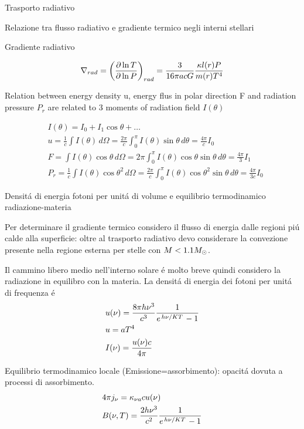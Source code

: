 \documentclass[10pt,xcolor={usenames},fleqn,mathserif,serif]{beamer}
\begin{document}
\begin{frame}{Trasporto radiativo}
\begin{block}{Relazione tra flusso radiativo e gradiente termico negli interni stellari}
\end{block}

\begin{block}{Gradiente radiativo}

\begin{equation*}
\nrad{}=\Dcvar{\PDly{P}{T}}{rad}=\frac{3}{16\pi acG}\frac{\kappa l(r)P}{m(r)T^4}%
\end{equation*}

\end{block}

\end{frame}

\begin{wordonframe}{Relation between energy density u, energy flus in polar direction F and radiation pressure $P_r$ are related to 3 moments of radiation field $I(\theta)$}

\begin{align*}
&I(\theta)=I_0+I_1\cos{\theta}+\ldots\\
&u=\frac{1}{c}\int I(\theta)\,d\Omega=\frac{2\pi}{c}\int_0^{\pi} I(\theta)\sin{\theta}\,d\theta=\frac{4\pi}{c}I_0\\
&F=\int I(\theta)\cos{\theta}\,d\Omega=2\pi\int_0^{\pi} I(\theta)\cos{\theta}\sin{\theta}\,d\theta=\frac{4\pi}{3}I_1\\
&P_r=\frac{1}{c}\int I(\theta)\cos{\theta}^2\,d\Omega=\frac{2\pi}{c}\int_0^{\pi} I(\theta)\cos{\theta}^2\sin{\theta}\,d\theta=\frac{4\pi}{3c}I_0
\end{align*}

\end{wordonframe}

\begin{wordonframe}{Densit\'a di energia fotoni per unit\'a di volume e equilibrio termodinamico radiazione-materia}

Per determinare il gradiente termico considero il flusso di energia dalle regioni pi\'u calde alla superficie: oltre al trasporto radiativo devo considerare la convezione presente nella regione esterna per stelle con $M<1.1M_{\odot}{}$.

Il cammino libero medio nell'interno solare \'e molto breve quindi considero la radiazione in equilibro con la materia. La densit\'a di energia dei fotoni per unit\'a di frequenza \'e
\begin{align*}
&u(\nu)=\frac{8\pi h\nu^3}{c^3}\frac{1}{e^{\left.{h\nu}\middle/{KT}\right.}-1}\\
&u=aT^4\\
&I(\nu)=\frac{u(\nu)c}{4\pi}
\end{align*}

Equilibrio termodinamico locale (Emissione=assorbimento): opacit\'a dovuta a processi di assorbimento.
\begin{align*}
&4\pi j_{\nu}=\kappa_{\nu a}cu(\nu)\\
&B(\nu,T)=\frac{2h\nu^3}{c^2}\frac{1}{e^{\left.{h\nu}\middle/{KT}\right.}-1}
\end{align*}

\end{wordonframe}
\end{document}

